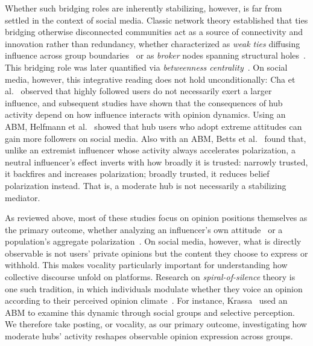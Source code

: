 \documentclass{svproc}
\def\dgreen#1{\textcolor[rgb]{0.02,0.50,0.05}{#1}}
\begin{document}
Whether such bridging roles are inherently stabilizing, however, is
far from settled in the context of social media. Classic network
theory established that ties bridging otherwise disconnected
communities act as a source of connectivity and innovation rather than
redundancy, whether characterized as \emph{weak ties} diffusing
influence across group boundaries~\cite{granovetter1973} or as
\emph{broker} nodes spanning structural holes~\cite{burt1992}. This
bridging role was later quantified via \emph{betweenness
centrality}~\cite{freeman1977}. On social media,
however, this integrative reading does not hold unconditionally: Cha
et al.~\cite{cha2010} observed that highly followed users do not
necessarily exert a larger influence, 
and subsequent studies have shown that
the consequences of hub activity depend on how influence interacts with
opinion dynamics.
Using an ABM, Helfmann
et al.~\cite{helfm2023} showed that hub users who adopt extreme
attitudes can gain more followers on social media. Also with an ABM,
Betts et al.~\cite{betts2023} found that, unlike an extremist
influencer whose activity always accelerates polarization, a neutral
influencer's effect inverts with how broadly it is trusted: narrowly
trusted, it backfires and increases polarization; broadly trusted, it
reduces belief polarization instead. That is, a moderate hub is not
necessarily a stabilizing mediator.
\par


\dgreen{As reviewed above, most of these studies focus on opinion positions
themselves as the primary outcome, whether analyzing an influencer's
own attitude~\cite{helfm2023} or a population's aggregate
polarization~\cite{betts2023,sasahara2020}. On social media, however,
what is directly observable is not users' private opinions but the
content they choose to express or withhold. This makes vocality
particularly important for understanding how collective discourse unfold
on platforms. 
Research on 
\emph{spiral-of-silence} theory is one such tradition, in which individuals modulate
whether they voice an opinion according to their perceived opinion
climate~\cite{noelle-neumann1974}. For instance, Krassa~\cite{krassa1988} used an
ABM to examine this dynamic through social groups and selective
perception. We therefore take posting, or vocality, as our primary
outcome, investigating how moderate hubs' activity reshapes observable
opinion expression across groups.}
\par
\end{document}
